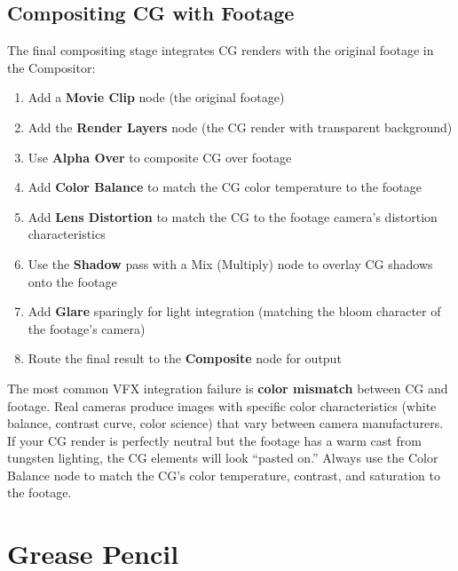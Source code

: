 \subsection{Compositing CG with Footage}

The final compositing stage integrates CG renders with the original footage in the Compositor:

\begin{enumerate}[leftmargin=2em]
  \item Add a \textbf{Movie Clip} node (the original footage)
  \item Add the \textbf{Render Layers} node (the CG render with transparent background)
  \item Use \textbf{Alpha Over} to composite CG over footage
  \item Add \textbf{Color Balance} to match the CG color temperature to the footage
  \item Add \textbf{Lens Distortion} to match the CG to the footage camera's distortion characteristics
  \item Use the \textbf{Shadow} pass with a Mix (Multiply) node to overlay CG shadows onto the footage
  \item Add \textbf{Glare} sparingly for light integration (matching the bloom character of the footage's camera)
  \item Route the final result to the \textbf{Composite} node for output
\end{enumerate}

\begin{warningbox}
The most common VFX integration failure is \textbf{color mismatch} between CG and footage. Real cameras produce images with specific color characteristics (white balance, contrast curve, color science) that vary between camera manufacturers. If your CG render is perfectly neutral but the footage has a warm cast from tungsten lighting, the CG elements will look ``pasted on.'' Always use the Color Balance node to match the CG's color temperature, contrast, and saturation to the footage.
\end{warningbox}

\section{Grease Pencil}
\label{sec:grease-pencil}

